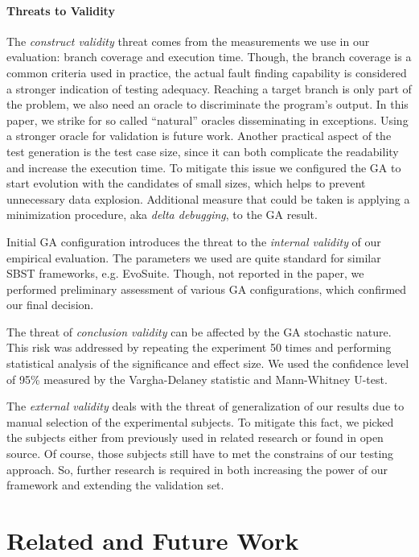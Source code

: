 \documentclass[sigconf,review,anonymous]{acmart}
\begin{document}
\paragraph{\textbf{Threats to Validity}}
The \emph{construct validity} threat comes from the measurements we use in our evaluation: branch coverage and execution time. Though, the branch coverage is a common criteria used in practice, the actual fault finding capability is considered a stronger indication of testing adequacy. Reaching a target branch is only part of the problem, we also need an oracle to discriminate the program's output. In this paper, we strike for so called ``natural'' oracles disseminating in exceptions. Using a stronger oracle for validation is future work. Another practical aspect of the test generation is the test case size, since it can both complicate the readability and increase the execution time. To mitigate this issue we configured the GA to start evolution with the candidates of small sizes, which helps to prevent unnecessary data explosion. Additional measure that could be taken is applying a minimization procedure, aka \emph{delta debugging}, to the GA result.

Initial GA configuration introduces the threat to the \emph{internal validity} of our empirical evaluation. The parameters we used are quite standard for similar SBST frameworks, e.g. EvoSuite. Though, not reported in the paper, we performed preliminary assessment of various GA configurations, which confirmed our final decision.

The threat of \emph{conclusion validity} can be affected by the GA stochastic nature. This risk was addressed by repeating the experiment 50 times and performing statistical analysis of the significance and effect size. We used the confidence level of 95\% measured by the Vargha-Delaney statistic and Mann-Whitney U-test. 

The \emph{external validity} deals with the threat of generalization of our results due to manual selection of the experimental subjects. To mitigate this fact, we picked the subjects either from previously used in related research or found in open source. Of course, those subjects still have to met the constrains of our testing approach. So, further research is required in both increasing the power of our framework and extending the validation set.


\section{Related and Future Work}
\label{sec:related.work}
\end{document}
